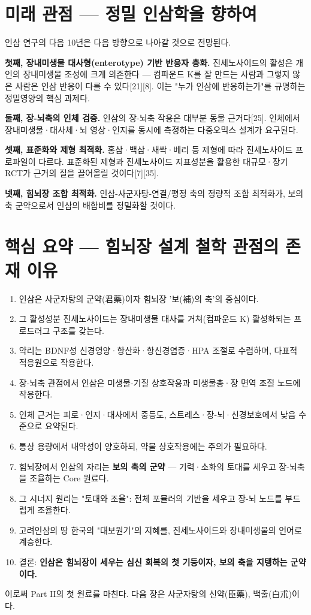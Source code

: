 \documentclass[11pt,oneside]{book}
\begin{document}
\section{미래 관점 — 정밀 인삼학을 향하여}
인삼 연구의 다음 10년은 다음 방향으로 나아갈 것으로 전망된다.

\textbf{첫째, 장내미생물 대사형(enterotype) 기반 반응자 층화.} 진세노사이드의 활성은 개인의 장내미생물 조성에 크게 의존한다 — 컴파운드 K를 잘 만드는 사람과 그렇지 않은 사람은 인삼 반응이 다를 수 있다[21][8]. 이는 "누가 인삼에 반응하는가"를 규명하는 정밀영양의 핵심 과제다.

\textbf{둘째, 장-뇌축의 인체 검증.} 인삼의 장-뇌축 작용은 대부분 동물 근거다[25]. 인체에서 장내미생물·대사체·뇌 영상·인지를 동시에 측정하는 다중오믹스 설계가 요구된다.

\textbf{셋째, 표준화와 제형 최적화.} 홍삼·백삼·새싹·베리 등 제형에 따라 진세노사이드 프로파일이 다르다. 표준화된 제형과 진세노사이드 지표성분을 활용한 대규모·장기 RCT가 근거의 질을 끌어올릴 것이다[7][35].

\textbf{넷째, 힘뇌장 조합 최적화.} 인삼-사군자탕-연결/평정 축의 정량적 조합 최적화가, 보의 축 군약으로서 인삼의 배합비를 정밀화할 것이다.

\section{핵심 요약 — 힘뇌장 설계 철학 관점의 존재 이유}
\begin{enumerate}[leftmargin=6mm,itemsep=1pt,topsep=2pt]
  \item 인삼은 사군자탕의 군약(君藥)이자 힘뇌장 '보(補)의 축'의 중심이다.
  \item 그 활성성분 진세노사이드는 장내미생물 대사를 거쳐(컴파운드 K) 활성화되는 프로드러그 구조를 갖는다.
  \item 약리는 BDNF성 신경영양·항산화·항신경염증·HPA 조절로 수렴하며, 다표적 적응원으로 작용한다.
  \item 장-뇌축 관점에서 인삼은 미생물-기질 상호작용과 미생물총·장 면역 조절 노드에 작용한다.
  \item 인체 근거는 피로·인지·대사에서 중등도, 스트레스·장-뇌·신경보호에서 낮음 수준으로 요약된다.
  \item 통상 용량에서 내약성이 양호하되, 약물 상호작용에는 주의가 필요하다.
  \item 힘뇌장에서 인삼의 자리는 \textbf{보의 축의 군약} — 기력·소화의 토대를 세우고 장-뇌축을 조율하는 Core 원료다.
  \item 그 시너지 원리는 "토대와 조율": 전체 포뮬러의 기반을 세우고 장-뇌 노드를 부드럽게 조율한다.
  \item 고려인삼의 땅 한국의 "대보원기"의 지혜를, 진세노사이드와 장내미생물의 언어로 계승한다.
  \item 결론: \textbf{인삼은 힘뇌장이 세우는 심신 회복의 첫 기둥이자, 보의 축을 지탱하는 군약이다.}
\end{enumerate}
이로써 Part II의 첫 원료를 마친다. 다음 장은 사군자탕의 신약(臣藥), 백출(白朮)이다.
\end{document}
